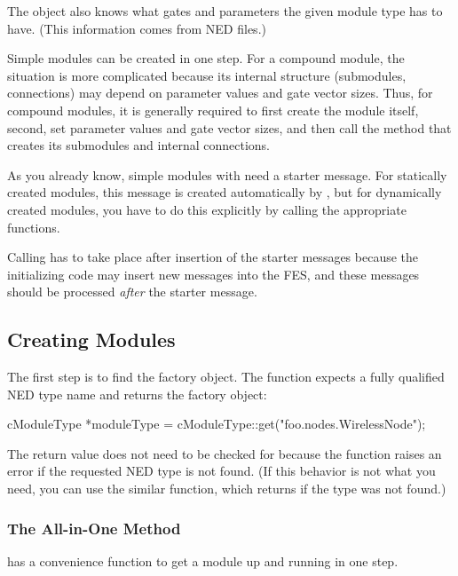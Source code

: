 The  object also knows what gates and
parameters the given module type has to have. (This information comes from
NED files.)

Simple modules can be created in one step. For a compound module, the
situation is more complicated because its internal structure
(submodules, connections) may depend on parameter values and gate
vector sizes. Thus, for compound modules, it is generally required to
first create the module itself, second, set parameter values and gate
vector sizes, and then call the method that creates its submodules and
internal connections.

As you already know, simple modules with  need a
starter message. For statically created
modules, this message is created automatically by {{\opp}}, but for
dynamically created modules, you have to do this explicitly by calling
the appropriate functions.

Calling  has to take place after insertion of the
starter messages because the initializing code may insert new messages
into the FES, and these messages should be processed
\textit{after} the starter message.


\subsection{Creating Modules}
\label{sec:simple-modules:dynamic-creation:api}

The first step is to find the factory object. The 
function expects a fully qualified NED type name and returns the factory
object:

\begin{cpp}
cModuleType *moduleType = cModuleType::get("foo.nodes.WirelessNode");
\end{cpp}

The return value does not need to be checked for  because
the function raises an error if the requested NED type is not found.
(If this behavior is not what you need, you can use the similar
 function, which returns  if the type
was not found.)

\subsubsection{The All-in-One Method}
\label{sec:simple-modules:dynamic:createscheduleinit}

 has a
convenience function to get a module up and running in one step.

